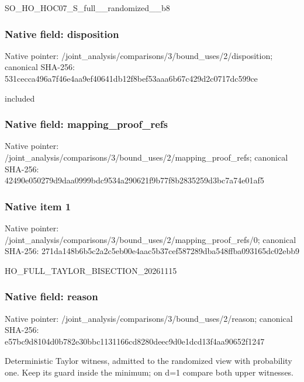 \documentclass[10pt,a4paper]{article}
\begin{document}
\begingroup\raggedright\sloppy SO\_\allowbreak{}HO\_\allowbreak{}HOC07\_\allowbreak{}S\_\allowbreak{}full\_\allowbreak{}\_\allowbreak{}randomized\_\allowbreak{}\_\allowbreak{}b8\par\endgroup

\subsubsection{Native field: disposition}
Native pointer: /joint\_\allowbreak{}analysis/comparisons/3/bound\_\allowbreak{}uses/2/disposition; canonical SHA-256: 531cecca496a7f46e4aa9ef40641db12f8bef53aaa6b67c429d2c0717dc599ce

\begingroup\raggedright\sloppy included\par\endgroup

\subsubsection{Native field: mapping\_\allowbreak{}proof\_\allowbreak{}refs}
Native pointer: /joint\_\allowbreak{}analysis/comparisons/3/bound\_\allowbreak{}uses/2/mapping\_\allowbreak{}proof\_\allowbreak{}refs; canonical SHA-256: 42490e050279d9daa0999bdc9534a290621f9b77f8b2835259d3bc7a74e01af5

\subsubsection{Native item 1}
Native pointer: /joint\_\allowbreak{}analysis/comparisons/3/bound\_\allowbreak{}uses/2/mapping\_\allowbreak{}proof\_\allowbreak{}refs/0; canonical SHA-256: 271da148b6b5c2a2c5eb00e4aac5b37cef587289dba548ffba093165dc02ebb9

\begingroup\raggedright\sloppy HO\_\allowbreak{}FULL\_\allowbreak{}TAYLOR\_\allowbreak{}BISECTION\_\allowbreak{}20261115\par\endgroup

\subsubsection{Native field: reason}
Native pointer: /joint\_\allowbreak{}analysis/comparisons/3/bound\_\allowbreak{}uses/2/reason; canonical SHA-256: e57bc9d8104d0b782e30bbc1131166cd8280deec9d0e1dcd13f4aa90652f1247

\begingroup\raggedright\sloppy Deterministic Taylor witness,\allowbreak{} admitted to the randomized view with probability one. Keep its guard inside the minimum;\allowbreak{} on d=\allowbreak{}1 compare both upper witnesses.\par\endgroup
\end{document}
